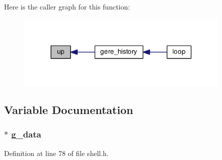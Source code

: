 Here is the caller graph for this function\-:
\nopagebreak
\begin{figure}[H]
\begin{center}
\leavevmode
\includegraphics[width=290pt]{shell_8h_acbb6e8e618f4c43c7eeb93923b92e385_icgraph}
\end{center}
\end{figure}




\subsection{Variable Documentation}
\subsubsection[{g\-\_\-data}]{$\ast$ g\-\_\-data}\label{shell_8h_a5abe4787847342ca58d34fb513b84cf2}


Definition at line 78 of file shell.\-h.


